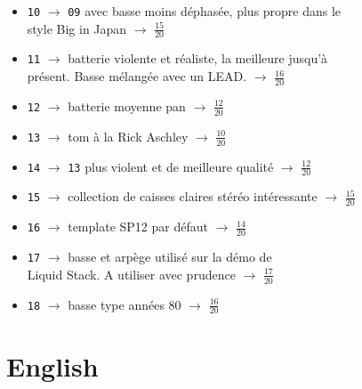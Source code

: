 \documentclass[a4paper, 13pt]{article}
\begin{document}
\begin{itemize}
    \item \texttt{10} $\rightarrow$ \texttt{09} avec basse moins déphasée, plus propre dans le \\ style Big in Japan $\rightarrow$ \Large{$\frac{15}{20}$} \normalsize \vspace{0.2cm}
    \item \texttt{11} $\rightarrow$ batterie violente et réaliste, la meilleure jusqu'à \\ présent. Basse mélangée avec un LEAD. $\rightarrow$ \Large{$\frac{16}{20}$} \normalsize \vspace{0.2cm}
    \item \texttt{12} $\rightarrow$ batterie moyenne pan $\rightarrow$ \Large{$\frac{12}{20}$} \normalsize \vspace{0.2cm}
    \item \texttt{13} $\rightarrow$ tom à la Rick Aschley $\rightarrow$ \Large{$\frac{10}{20}$} \normalsize \vspace{0.2cm}
    \item \texttt{14} $\rightarrow$ \texttt{13} plus violent et de meilleure qualité $\rightarrow$ \Large{$\frac{12}{20}$} \normalsize \vspace{0.2cm}
    \item \texttt{15} $\rightarrow$ collection de caisses claires stéréo intéressante $\rightarrow$ \Large{$\frac{15}{20}$} \normalsize \vspace{0.2cm}
    \item \texttt{16} $\rightarrow$ template SP12 par défaut $\rightarrow$ \Large{$\frac{14}{20}$} \normalsize \vspace{0.2cm}
    \item \texttt{17} $\rightarrow$ basse et arpège utilisé sur la démo de \\ Liquid Stack. A utiliser avec prudence $\rightarrow$ \Large{$\frac{17}{20}$} \normalsize \vspace{0.2cm}
    \item \texttt{18} $\rightarrow$ basse type années 80 $\rightarrow$ \Large{$\frac{16}{20}$} \normalsize \vspace{0.2cm}
\end{itemize}


\vspace{1cm}
\section*{English}
\end{document}

